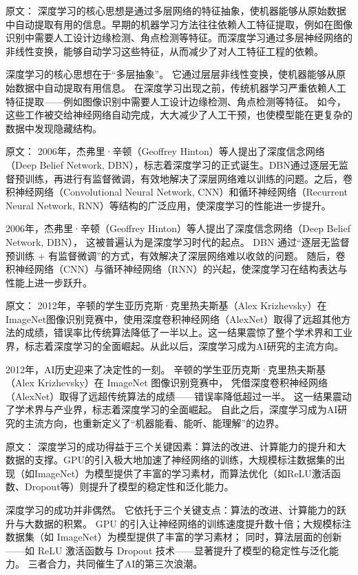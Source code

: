 原文：
深度学习的核心思想是通过多层网络的特征抽象，使机器能够从原始数据中自动提取有用的信息。早期的机器学习方法往往依赖人工特征提取，例如在图像识别中需要人工设计边缘检测、角点检测等特征。而深度学习通过多层神经网络的非线性变换，能够自动学习这些特征，从而减少了对人工特征工程的依赖。

深度学习的核心思想在于“多层抽象”。  
它通过层层非线性变换，使机器能够从原始数据中自动提取有用信息。  
在深度学习出现之前，传统机器学习严重依赖人工特征提取——例如图像识别中需要人工设计边缘检测、角点检测等特征。  
如今，这些工作被交给神经网络自动完成，大大减少了人工干预，也使模型能在更复杂的数据中发现隐藏结构。

原文：
2006年，杰弗里·辛顿（Geoffrey Hinton）等人提出了深度信念网络（Deep Belief Network, DBN），标志着深度学习的正式诞生。DBN通过逐层无监督预训练，再进行有监督微调，有效地解决了深层网络难以训练的问题。之后，卷积神经网络（Convolutional Neural Network, CNN）和循环神经网络（Recurrent Neural Network, RNN）等结构的广泛应用，使深度学习的性能进一步提升。

2006年，杰弗里·辛顿（Geoffrey Hinton）等人提出了深度信念网络（Deep Belief Network, DBN），  
这被普遍认为是深度学习时代的起点。  
DBN 通过“逐层无监督预训练 + 有监督微调”的方式，有效解决了深层网络难以收敛的问题。  
随后，卷积神经网络（CNN）与循环神经网络（RNN）的兴起，使深度学习在结构表达与性能上进一步跃升。

原文：
2012年，辛顿的学生亚历克斯·克里热夫斯基（Alex Krizhevsky）在ImageNet图像识别竞赛中，使用深度卷积神经网络（AlexNet）取得了远超其他方法的成绩，错误率比传统算法降低了一半以上。这一结果震惊了整个学术界和工业界，标志着深度学习的全面崛起。从此以后，深度学习成为AI研究的主流方向。

2012年，AI历史迎来了决定性的一刻。  
辛顿的学生亚历克斯·克里热夫斯基（Alex Krizhevsky）在 ImageNet 图像识别竞赛中，  
凭借深度卷积神经网络（AlexNet）取得了远超传统算法的成绩——错误率降低超过一半。  
这一结果震动了学术界与产业界，标志着深度学习的全面崛起。  
自此之后，深度学习成为AI研究的主流方向，也重新定义了“机器能看、能听、能理解”的边界。

原文：
深度学习的成功得益于三个关键因素：算法的改进、计算能力的提升和大数据的支撑。GPU的引入极大地加速了神经网络的训练，大规模标注数据集的出现（如ImageNet）为模型提供了丰富的学习素材，而算法优化（如ReLU激活函数、Dropout等）则提升了模型的稳定性和泛化能力。

深度学习的成功并非偶然。  
它依托于三个关键支点：算法的改进、计算能力的跃升与大数据的积累。  
GPU 的引入让神经网络的训练速度提升数十倍；大规模标注数据集（如 ImageNet）为模型提供了丰富的学习素材；  
同时，算法层面的创新——如 ReLU 激活函数与 Dropout 技术——显著提升了模型的稳定性与泛化能力。  
三者合力，共同催生了AI的第三次浪潮。

